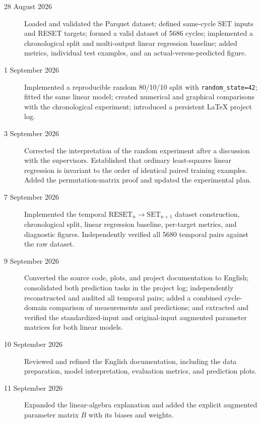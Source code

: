 \documentclass[11pt,a4paper]{article}
\begin{document}
\begin{description}
    \item[28 August 2026] Loaded and validated the Parquet dataset; defined
    same-cycle SET inputs and RESET targets; formed a valid dataset of 5686
    cycles; implemented a chronological split and multi-output linear
    regression baseline; added metrics, individual test examples, and an
    actual-versus-predicted figure.

    \item[1 September 2026] Implemented a reproducible random 80/10/10 split
    with \texttt{random\_state=42}; fitted the same linear model; created
    numerical and graphical comparisons with the chronological experiment;
    introduced a persistent LaTeX project log.

    \item[3 September 2026] Corrected the interpretation of the random
    experiment after a discussion with the supervisors. Established that
    ordinary least-squares linear regression is invariant to the order of
    identical paired training examples. Added the permutation-matrix proof and
    updated the experimental plan.

    \item[7 September 2026] Implemented the temporal
    $\mathrm{RESET}_n\rightarrow\mathrm{SET}_{n+1}$ dataset construction,
    chronological split, linear regression baseline, per-target metrics, and
    diagnostic figures. Independently verified all 5680 temporal pairs against
    the raw dataset.

    \item[9 September 2026] Converted the source code, plots, and project
    documentation to English; consolidated both prediction tasks in the
    project log; independently reconstructed and audited all temporal pairs;
    added a combined cycle-domain comparison of measurements and predictions;
    and extracted and verified the standardized-input and original-input
    augmented parameter matrices for both linear models.

    \item[10 September 2026] Reviewed and refined the English documentation,
    including the data preparation, model interpretation, evaluation metrics,
    and prediction plots.


    \item[11 September 2026] Expanded the linear-algebra explanation and added
    the explicit augmented parameter matrix $B$ with its biases and weights.

\end{description}
\end{document}
